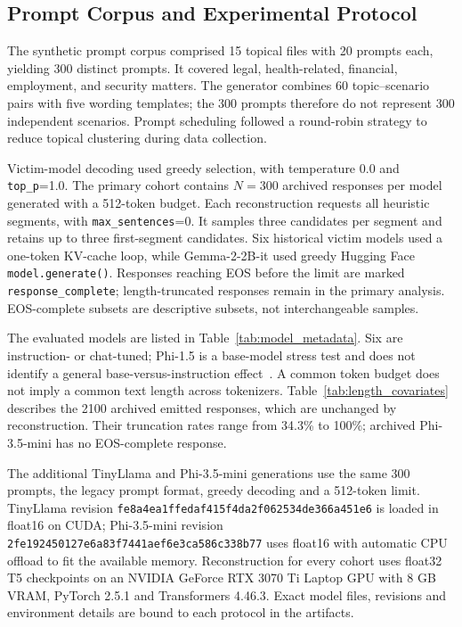 \documentclass[electronics,article,submit,pdftex,moreauthors]{Definitions/mdpi}
\begin{document}
\subsection{Prompt Corpus and Experimental Protocol}
The synthetic prompt corpus comprised 15 topical files with 20 prompts each, yielding 300 distinct prompts. It covered legal, health-related, financial, employment, and security matters. The generator combines 60 topic--scenario pairs with five wording templates; the 300 prompts therefore do not represent 300 independent scenarios. Prompt scheduling followed a round-robin strategy to reduce topical clustering during data collection.

Victim-model decoding used greedy selection, with temperature 0.0 and \texttt{top\_p}=1.0. The primary cohort contains $N=300$ archived responses per model generated with a 512-token budget. Each reconstruction requests all heuristic segments, with \texttt{max\_sentences}=0. It samples three candidates per segment and retains up to three first-segment candidates. Six historical victim models used a one-token KV-cache loop, while Gemma-2-2B-it used greedy Hugging Face \texttt{model.generate()}. Responses reaching EOS before the limit are marked \texttt{response\_complete}; length-truncated responses remain in the primary analysis. EOS-complete subsets are descriptive subsets, not interchangeable samples.

The evaluated models are listed in Table~\ref{tab:model_metadata}. Six are instruction- or chat-tuned; Phi-1.5 is a base-model stress test and does not identify a general base-versus-instruction effect~\cite{qwen25report,llama3report,llama32blog,gemma2report,phi15report,tinyllama2024,phi3report}. A common token budget does not imply a common text length across tokenizers. Table~\ref{tab:length_covariates} describes the 2100 archived emitted responses, which are unchanged by reconstruction. Their truncation rates range from 34.3\% to 100\%; archived Phi-3.5-mini has no EOS-complete response.

The additional TinyLlama and Phi-3.5-mini generations use the same 300 prompts, the legacy prompt format, greedy decoding and a 512-token limit. TinyLlama revision \texttt{fe8a4ea1ffedaf415f4da2f062534de366a451e6} is loaded in float16 on CUDA; Phi-3.5-mini revision \texttt{2fe192450127e6a83f7441aef6e3ca586c338b77} uses float16 with automatic CPU offload to fit the available memory. Reconstruction for every cohort uses float32 T5 checkpoints on an NVIDIA GeForce RTX 3070 Ti Laptop GPU with 8 GB VRAM, PyTorch 2.5.1 and Transformers 4.46.3. Exact model files, revisions and environment details are bound to each protocol in the artifacts.
\end{document}
